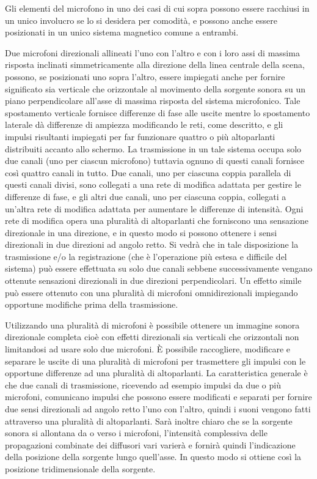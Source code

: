 \documentclass[11pt]{article}
\begin{document}
\begin{multicols*}{2}
Gli elementi del microfono in uno dei casi di cui sopra possono essere racchiusi in un unico involucro se lo si desidera per comodità, e possono anche essere posizionati in un unico sistema magnetico comune a entrambi.

Due microfoni direzionali allineati l'uno con l'altro e con i loro assi di massima risposta inclinati simmetricamente alla direzione della linea centrale della scena, possono, se posizionati uno sopra l'altro, essere impiegati anche per fornire significato sia verticale che orizzontale al movimento della sorgente sonora su un piano perpendicolare all'asse di massima risposta del sistema microfonico. Tale spostamento verticale fornisce differenze di fase alle uscite mentre lo spostamento laterale dà differenze di ampiezza modificando le reti, come descritto, e gli impulsi risultanti impiegati per far funzionare quattro o più altoparlanti distribuiti accanto allo schermo. La trasmissione in un tale sistema occupa solo due canali (uno per ciascun microfono) tuttavia ognuno di questi canali fornisce così quattro canali in tutto. Due canali, uno per ciascuna coppia parallela di questi canali divisi, sono collegati a una rete di modifica adattata per gestire le differenze di fase, e gli altri due canali, uno per ciascuna coppia, collegati a un'altra rete di modifica adattata per aumentare le differenze di intensità. Ogni rete di modifica opera una pluralità di altoparlanti che forniscono una sensazione direzionale in una direzione, e in questo modo si possono ottenere i sensi direzionali in due direzioni ad angolo retto. Si vedrà che in tale disposizione la trasmissione e/o la registrazione (che è l'operazione più estesa e difficile del sistema) può essere effettuata su solo due canali sebbene successivamente vengano ottenute sensazioni direzionali in due direzioni perpendicolari. Un effetto simile può essere ottenuto con una pluralità di microfoni omnidirezionali impiegando opportune modifiche prima della trasmissione.

Utilizzando una pluralità di microfoni è possibile ottenere un immagine sonora direzionale completa cioè con effetti direzionali sia verticali che orizzontali non limitandosi ad usare solo due microfoni. È possibile raccogliere, modificare e separare le uscite di una pluralità di microfoni per trasmettere gli impulsi con le opportune differenze ad una pluralità di altoparlanti. La caratteristica generale è che due canali di trasmissione, ricevendo ad esempio impulsi da due o più microfoni, comunicano impulsi che possono essere modificati e separati per fornire due sensi direzionali ad angolo retto l'uno con l'altro, quindi i suoni vengono fatti attraverso una pluralità di altoparlanti. Sarà inoltre chiaro che se la sorgente sonora si allontana da o verso i microfoni, l'intensità complessiva delle propagazioni combinate dei diffusori vari varierà e fornirà quindi l'indicazione della posizione della sorgente lungo quell'asse. In questo modo si ottiene così la posizione tridimensionale della sorgente.


\end{multicols*}
\end{document}
